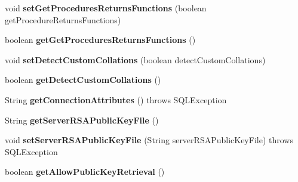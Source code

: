 \begin{DoxyCompactItemize}
void {\bfseries set\+Get\+Procedures\+Returns\+Functions} (boolean get\+Procedure\+Returns\+Functions)
\item 
\mbox{\label{interfacecom_1_1mysql_1_1jdbc_1_1_connection_properties_ab75e56815e1e740893f5a550b87538ec}} 
boolean {\bfseries get\+Get\+Procedures\+Returns\+Functions} ()
\item 
\mbox{\label{interfacecom_1_1mysql_1_1jdbc_1_1_connection_properties_abd3f60f7f1de14df3c833019963572de}} 
void {\bfseries set\+Detect\+Custom\+Collations} (boolean detect\+Custom\+Collations)
\item 
\mbox{\label{interfacecom_1_1mysql_1_1jdbc_1_1_connection_properties_ab9a63f897dd8fc41f23427c88b2e363c}} 
boolean {\bfseries get\+Detect\+Custom\+Collations} ()
\item 
\mbox{\label{interfacecom_1_1mysql_1_1jdbc_1_1_connection_properties_ab769db5f88749ad996de89182f8f5e8f}} 
String {\bfseries get\+Connection\+Attributes} ()  throws S\+Q\+L\+Exception
\item 
\mbox{\label{interfacecom_1_1mysql_1_1jdbc_1_1_connection_properties_a9490980fbc83e5814926ca2c688bc067}} 
String {\bfseries get\+Server\+R\+S\+A\+Public\+Key\+File} ()
\item 
\mbox{\label{interfacecom_1_1mysql_1_1jdbc_1_1_connection_properties_aa5e8ce20fcec8406d5037361664d14b6}} 
void {\bfseries set\+Server\+R\+S\+A\+Public\+Key\+File} (String server\+R\+S\+A\+Public\+Key\+File)  throws S\+Q\+L\+Exception
\item 
\mbox{\label{interfacecom_1_1mysql_1_1jdbc_1_1_connection_properties_a65f3e816ea00cb79bb0e29780173405b}} 
boolean {\bfseries get\+Allow\+Public\+Key\+Retrieval} ()
\item 
\mbox{\label{interfacecom_1_1mysql_1_1jdbc_1_1_connection_properties_aee80105021f4ca128e32aefb631c08b5}} 

\end{DoxyCompactItemize}
